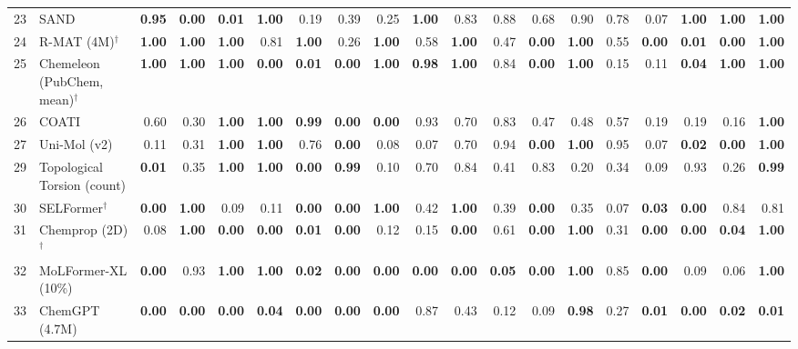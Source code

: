 \documentclass{article}
\begin{document}
\begin{table}[H]
{\begin{tabular}{@{}rlrrrrrrrrrrrrrrrrr@{}}
23 & SAND & \textbf{0.95} & \textbf{0.00} & \textbf{0.01} & \textbf{1.00} & 0.19 & 0.39 & 0.25 & \textbf{1.00} & 0.83 & 0.88 & 0.68 & 0.90 & 0.78 & 0.07 & \textbf{1.00} & \textbf{1.00} & \textbf{1.00} \\
24 & R-MAT (4M)$^\dagger$ & \textbf{1.00} & \textbf{1.00} & \textbf{1.00} & 0.81 & \textbf{1.00} & 0.26 & \textbf{1.00} & 0.58 & \textbf{1.00} & 0.47 & \textbf{0.00} & \textbf{1.00} & 0.55 & \textbf{0.00} & \textbf{0.01} & \textbf{0.00} & \textbf{1.00} \\
25 & Chemeleon (PubChem, mean)$^\dagger$ & \textbf{1.00} & \textbf{1.00} & \textbf{1.00} & \textbf{0.00} & \textbf{0.01} & \textbf{0.00} & \textbf{1.00} & \textbf{0.98} & \textbf{1.00} & 0.84 & \textbf{0.00} & \textbf{1.00} & 0.15 & 0.11 & \textbf{0.04} & \textbf{1.00} & \textbf{1.00} \\
26 & COATI & 0.60 & 0.30 & \textbf{1.00} & \textbf{1.00} & \textbf{0.99} & \textbf{0.00} & \textbf{0.00} & 0.93 & 0.70 & 0.83 & 0.47 & 0.48 & 0.57 & 0.19 & 0.19 & 0.16 & \textbf{1.00} \\
27 & Uni-Mol (v2) & 0.11 & 0.31 & \textbf{1.00} & \textbf{1.00} & 0.76 & \textbf{0.00} & 0.08 & 0.07 & 0.70 & 0.94 & \textbf{0.00} & \textbf{1.00} & 0.95 & 0.07 & \textbf{0.02} & \textbf{0.00} & \textbf{1.00} \\
29 & Topological Torsion (count) & \textbf{0.01} & 0.35 & \textbf{1.00} & \textbf{1.00} & \textbf{0.00} & \textbf{0.99} & 0.10 & 0.70 & 0.84 & 0.41 & 0.83 & 0.20 & 0.34 & 0.09 & 0.93 & 0.26 & \textbf{0.99} \\
30 & SELFormer$^\dagger$ & \textbf{0.00} & \textbf{1.00} & 0.09 & 0.11 & \textbf{0.00} & \textbf{0.00} & \textbf{1.00} & 0.42 & \textbf{1.00} & 0.39 & \textbf{0.00} & 0.35 & 0.07 & \textbf{0.03} & \textbf{0.00} & 0.84 & 0.81 \\
31 & Chemprop (2D)$^\dagger$ & 0.08 & \textbf{1.00} & \textbf{0.00} & \textbf{0.00} & \textbf{0.01} & \textbf{0.00} & 0.12 & 0.15 & \textbf{0.00} & 0.61 & \textbf{0.00} & \textbf{1.00} & 0.31 & \textbf{0.00} & \textbf{0.00} & \textbf{0.04} & \textbf{1.00} \\
32 & MoLFormer-XL (10\%) & \textbf{0.00} & 0.93 & \textbf{1.00} & \textbf{1.00} & \textbf{0.02} & \textbf{0.00} & \textbf{0.00} & \textbf{0.00} & \textbf{0.00} & \textbf{0.05} & \textbf{0.00} & \textbf{1.00} & 0.85 & \textbf{0.00} & 0.09 & 0.06 & \textbf{1.00} \\
33 & ChemGPT (4.7M) & \textbf{0.00} & \textbf{0.00} & \textbf{0.00} & \textbf{0.04} & \textbf{0.00} & \textbf{0.00} & \textbf{0.00} & 0.87 & 0.43 & 0.12 & 0.09 & \textbf{0.98} & 0.27 & \textbf{0.01} & \textbf{0.00} & \textbf{0.02} & \textbf{0.01} \\

\end{tabular}}
\end{table}
\end{document}
